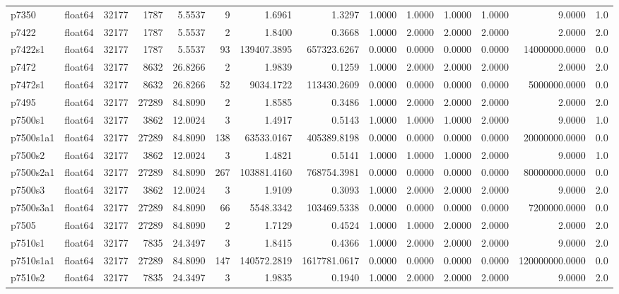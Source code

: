 \begin{longtable}{llrrrrrrrrrrrl}
p7350 & float64 & 32177 & 1787 & 5.5537 & 9 & 1.6961 & 1.3297 & 1.0000 & 1.0000 & 1.0000 & 1.0000 & 9.0000 & 1.0 \\
p7422 & float64 & 32177 & 1787 & 5.5537 & 2 & 1.8400 & 0.3668 & 1.0000 & 2.0000 & 2.0000 & 2.0000 & 2.0000 & 2.0 \\
p7422s1 & float64 & 32177 & 1787 & 5.5537 & 93 & 139407.3895 & 657323.6267 & 0.0000 & 0.0000 & 0.0000 & 0.0000 & 14000000.0000 & 0.0 \\
p7472 & float64 & 32177 & 8632 & 26.8266 & 2 & 1.9839 & 0.1259 & 1.0000 & 2.0000 & 2.0000 & 2.0000 & 2.0000 & 2.0 \\
p7472s1 & float64 & 32177 & 8632 & 26.8266 & 52 & 9034.1722 & 113430.2609 & 0.0000 & 0.0000 & 0.0000 & 0.0000 & 5000000.0000 & 0.0 \\
p7495 & float64 & 32177 & 27289 & 84.8090 & 2 & 1.8585 & 0.3486 & 1.0000 & 2.0000 & 2.0000 & 2.0000 & 2.0000 & 2.0 \\
p7500s1 & float64 & 32177 & 3862 & 12.0024 & 3 & 1.4917 & 0.5143 & 1.0000 & 1.0000 & 1.0000 & 2.0000 & 9.0000 & 1.0 \\
p7500s1a1 & float64 & 32177 & 27289 & 84.8090 & 138 & 63533.0167 & 405389.8198 & 0.0000 & 0.0000 & 0.0000 & 0.0000 & 20000000.0000 & 0.0 \\
p7500s2 & float64 & 32177 & 3862 & 12.0024 & 3 & 1.4821 & 0.5141 & 1.0000 & 1.0000 & 1.0000 & 2.0000 & 9.0000 & 1.0 \\
p7500s2a1 & float64 & 32177 & 27289 & 84.8090 & 267 & 103881.4160 & 768754.3981 & 0.0000 & 0.0000 & 0.0000 & 0.0000 & 80000000.0000 & 0.0 \\
p7500s3 & float64 & 32177 & 3862 & 12.0024 & 3 & 1.9109 & 0.3093 & 1.0000 & 2.0000 & 2.0000 & 2.0000 & 9.0000 & 2.0 \\
p7500s3a1 & float64 & 32177 & 27289 & 84.8090 & 66 & 5548.3342 & 103469.5338 & 0.0000 & 0.0000 & 0.0000 & 0.0000 & 7200000.0000 & 0.0 \\
p7505 & float64 & 32177 & 27289 & 84.8090 & 2 & 1.7129 & 0.4524 & 1.0000 & 1.0000 & 2.0000 & 2.0000 & 2.0000 & 2.0 \\
p7510s1 & float64 & 32177 & 7835 & 24.3497 & 3 & 1.8415 & 0.4366 & 1.0000 & 2.0000 & 2.0000 & 2.0000 & 9.0000 & 2.0 \\
p7510s1a1 & float64 & 32177 & 27289 & 84.8090 & 147 & 140572.2819 & 1617781.0617 & 0.0000 & 0.0000 & 0.0000 & 0.0000 & 120000000.0000 & 0.0 \\
p7510s2 & float64 & 32177 & 7835 & 24.3497 & 3 & 1.9835 & 0.1940 & 1.0000 & 2.0000 & 2.0000 & 2.0000 & 9.0000 & 2.0 \\

\end{longtable}
